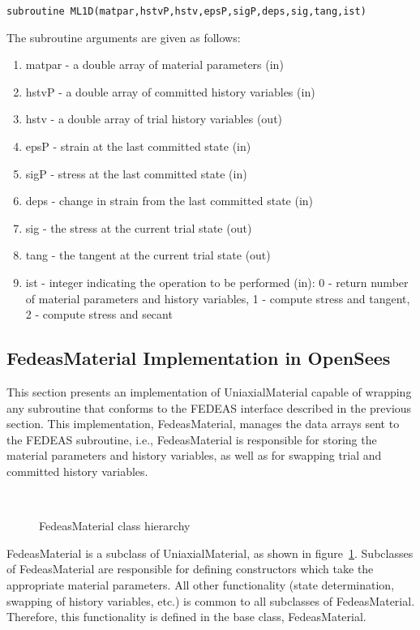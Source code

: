 \documentclass[12pt]{article}
\begin{document}
{\sf\small
\begin{verbatim}
subroutine ML1D(matpar,hstvP,hstv,epsP,sigP,deps,sig,tang,ist)
\end{verbatim}
}

\noindent The subroutine arguments are given as follows:

\begin{enumerate}
\item{matpar} - a double array of material parameters (in)
\item{hstvP} - a double array of committed history variables (in)
\item{hstv} - a double array of trial history variables (out)
\item{epsP} - strain at the last committed state (in)
\item{sigP} - stress at the last committed state (in)
\item{deps} - change in strain from the last committed state (in)
\item{sig} - the stress at the current trial state (out)
\item{tang} - the tangent at the current trial state (out)
\item{ist} - integer indicating the operation to be performed (in): 0 - return number
of material parameters and history variables, 1 - compute stress and tangent, 2 - compute 
stress and secant
\end{enumerate}

\subsection{FedeasMaterial Implementation in OpenSees}
This section presents an implementation of UniaxialMaterial capable of wrapping any
subroutine that conforms to the FEDEAS interface described in the previous
section. This implementation, FedeasMaterial, manages the data arrays sent to the
FEDEAS subroutine, i.e., FedeasMaterial is responsible for storing the material
parameters and history variables, as well as for swapping trial and committed history
variables.

\begin{figure}[htpb]
\begin{center}
\leavevmode
\hbox{%
}
\end{center}
\caption{FedeasMaterial class hierarchy}
\label{fig:Fedeas}
\end{figure}

FedeasMaterial is a subclass of UniaxialMaterial, as shown in figure~\ref{fig:Fedeas}.
Subclasses of FedeasMaterial are responsible for defining constructors which take the
appropriate material parameters. All other functionality (state determination, swapping
of history variables, etc.) is common to all subclasses of FedeasMaterial. Therefore,
this functionality is defined in the base class, FedeasMaterial.
\end{document}
